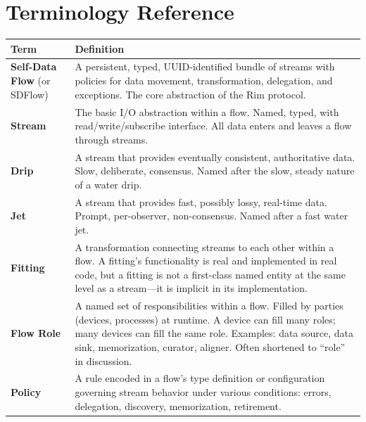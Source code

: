 \documentclass[11pt, letterpaper]{article}
\begin{document}
\newpage
\section{Terminology Reference}
\label{sec:terminology}

\begin{center}
\begin{longtable}{l p{10cm}}
\toprule
\textbf{Term} & \textbf{Definition} \\
\midrule
\endhead
\textbf{Self-Data Flow} (or SDFlow) &
  A persistent, typed, UUID-identified bundle of streams with policies for data
  movement, transformation, delegation, and exceptions. The core abstraction of the
  Rim protocol. \\[6pt]

\textbf{Stream} &
  The basic I/O abstraction within a flow. Named, typed, with read/write/subscribe
  interface. All data enters and leaves a flow through streams. \\[6pt]

\textbf{Drip} &
  A stream that provides eventually consistent, authoritative data. Slow, deliberate,
  consensus. Named after the slow, steady nature of a water drip. \\[6pt]

\textbf{Jet} &
  A stream that provides fast, possibly lossy, real-time data. Prompt, per-observer,
  non-consensus. Named after a fast water jet. \\[6pt]

\textbf{Fitting} &
  A transformation connecting streams to each other within a flow. A fitting's
  functionality is real and implemented in real code, but a fitting is not a first-class
  named entity at the same level as a stream---it is implicit in its implementation.
  \\[6pt]

\textbf{Flow Role} &
  A named set of responsibilities within a flow. Filled by parties (devices, processes)
  at runtime. A device can fill many roles; many devices can fill the same role.
  Examples: data source, data sink, memorization, curator, aligner. Often shortened to
  ``role'' in discussion. \\[6pt]

\textbf{Policy} &
  A rule encoded in a flow's type definition or configuration governing stream behavior
  under various conditions: errors, delegation, discovery, memorization, retirement. \\[6pt]


\end{longtable}
\end{center}
\end{document}
